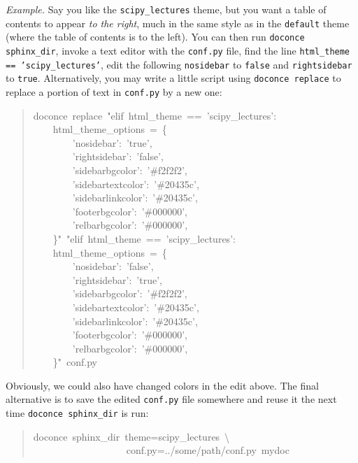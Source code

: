 \documentclass[a4paper]{article}
\begin{document}
\emph{Example.} Say you like the \texttt{scipy\_lectures} theme, but you want
a table of contents to appear \emph{to the right}, much in the same style
as in the \texttt{default} theme (where the table of contents is to the left).
You can then run \texttt{doconce sphinx\_dir}, invoke a text editor with the
\texttt{conf.py} file, find the line \texttt{html\_theme == 'scipy\_lectures'},
edit the following \texttt{nosidebar} to \texttt{false} and \texttt{rightsidebar} to \texttt{true}.
Alternatively, you may write a little script using \texttt{doconce replace}
to replace a portion of text in \texttt{conf.py} by a new one:
%
\begin{quote}{\ttfamily \raggedright \noindent
doconce~replace~"elif~html\_theme~==~'scipy\_lectures':\\
~~~~html\_theme\_options~=~\{\\
~~~~~~~~'nosidebar':~'true',\\
~~~~~~~~'rightsidebar':~'false',\\
~~~~~~~~'sidebarbgcolor':~'\#f2f2f2',\\
~~~~~~~~'sidebartextcolor':~'\#20435c',\\
~~~~~~~~'sidebarlinkcolor':~'\#20435c',\\
~~~~~~~~'footerbgcolor':~'\#000000',\\
~~~~~~~~'relbarbgcolor':~'\#000000',\\
~~~~\}"~"elif~html\_theme~==~'scipy\_lectures':\\
~~~~html\_theme\_options~=~\{\\
~~~~~~~~'nosidebar':~'false',\\
~~~~~~~~'rightsidebar':~'true',\\
~~~~~~~~'sidebarbgcolor':~'\#f2f2f2',\\
~~~~~~~~'sidebartextcolor':~'\#20435c',\\
~~~~~~~~'sidebarlinkcolor':~'\#20435c',\\
~~~~~~~~'footerbgcolor':~'\#000000',\\
~~~~~~~~'relbarbgcolor':~'\#000000',\\
~~~~\}"~conf.py
}
\end{quote}

Obviously, we could also have changed colors in the edit above.
The final alternative is to save the edited \texttt{conf.py} file somewhere
and reuse it the next time \texttt{doconce sphinx\_dir} is run:
%
\begin{quote}{\ttfamily \raggedright \noindent
doconce~sphinx\_dir~theme=scipy\_lectures~\textbackslash{}\\
~~~~~~~~~~~~~~~~~~~conf.py=../some/path/conf.py~mydoc
}
\end{quote}
\end{document}
